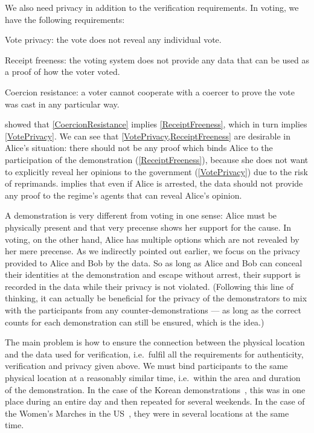 We also need privacy in addition to the verification requirements.
In voting, we have the following requirements:
\begin{requirements}[P]
\item\label{VotePrivacy} Vote privacy: the vote does not reveal any individual 
  vote.
\item\label{ReceiptFreeness} Receipt freeness: the voting system does not 
  provide any data that can be used as a proof of how the voter voted.
\item\label{CoercionResistance} Coercion resistance: a voter cannot cooperate 
  with a coercer to prove the vote was cast in any particular way.
\end{requirements}
\Textcite{VerifyingPrivacyPropertiesOfVotingProtocols} showed that 
\cref{CoercionResistance} implies \cref{ReceiptFreeness}, which in turn implies
\cref{VotePrivacy}.
We can see that \cref{VotePrivacy,ReceiptFreeness} are desirable in Alice's 
situation: there should not be any proof which binds Alice to the participation 
of the demonstration (\cref{ReceiptFreeness}), because she does not want to 
explicitly reveal her opinions to the government (\cref{VotePrivacy}) due to 
the risk of reprimands.
 implies that even if Alice is arrested, the data should 
not provide any proof to the regime's agents that can reveal Alice's opinion.

A demonstration is very different from voting in one sense: Alice must be 
physically present and that very precense shows her support for the cause.
In voting, on the other hand, Alice has multiple options which are not revealed
by her mere precense.
As we indirectly pointed out earlier, we focus on the privacy provided to Alice 
and Bob by the data.
So as long as Alice and Bob can conceal their identities at the demonstration 
and escape without arrest, their support is recorded in the data while their 
privacy is not violated.
(Following this line of thinking, it can actually be beneficial for the privacy of 
the demonstrators to mix with the participants from any counter-demonstrations 
--- as long as the correct counts for each demonstration can still be ensured, 
which is the idea.)

The main problem is how to ensure the connection between the physical location 
and the data used for verification, i.e.\ fulfil all the requirements for 
authenticity, verification and privacy given above.
We must bind participants to the same physical location at a reasonably similar 
time, i.e.\ within the area and duration of the demonstration.
In the case of the Korean demonstrations~\cite{2016DemonstrationsInSeoul}, this 
was in one place during an entire day and then repeated for several 
weekends.
In the case of the Women's Marches in the US~\cite{2017WomensMarchesInUS}, they
were in several locations at the same time.

